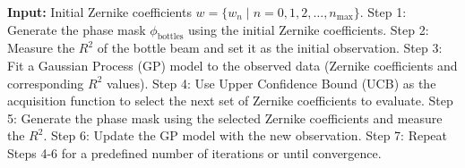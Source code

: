 \documentclass[11pt]{article}
\begin{document}
\begin{algorithm}[H]
    \caption{Bayesian Optimization in Zernike Kernel Space}
    \label{alg:bo_zks}
    \begin{algorithmic}[1]
    \State \textbf{Input:} Initial Zernike coefficients $w = \{ w_n \mid n = 0,1,2,\dots,n_{\max} \}$.
    \State Step 1: Generate the phase mask $\phi_{\text{bottles}}$ using the initial Zernike coefficients.
    \State Step 2: Measure the $R^2$ of the bottle beam and set it as the initial observation.
    \State Step 3: Fit a Gaussian Process (GP) model to the observed data (Zernike coefficients and corresponding $R^2$ values).
    \State Step 4: Use Upper Confidence Bound (UCB) as the acquisition function to select the next set of Zernike coefficients to evaluate.
    \State Step 5: Generate the phase mask using the selected Zernike coefficients and measure the $R^2$.
    \State Step 6: Update the GP model with the new observation.
    \State Step 7: Repeat Steps 4-6 for a predefined number of iterations or until convergence.
\end{algorithmic}
\end{algorithm}
    

    
\end{document}
